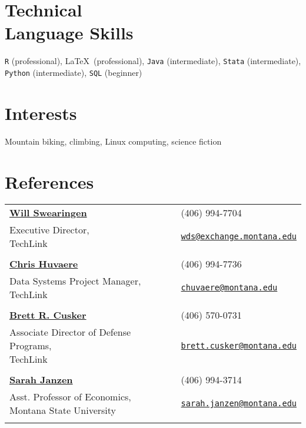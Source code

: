 \documentclass[resmargin, line, pifont ,palatino,courier]{res}
\newcommand{\halfwidth}{5.75cm}
\begin{document}
\begin{resume}
\section{\sc Technical \\ Language Skills}

\verb|R| (professional), \LaTeX~(professional), \verb|Java| (intermediate), \verb|Stata| (intermediate), \verb|Python| (intermediate), \verb|SQL| (beginner)

\section{\sc Interests} 
Mountain biking, climbing, Linux computing, science fiction

\section{\sc References}
\begin{tabular}{@{}p{\halfwidth} p{\halfwidth}}
	
{\bf \href{http://techlinkcenter.org/staff/dr-will-swearingen-clp}{Will Swearingen}} &  (406) 994-7704 \\
\parbox[t]{\halfwidth}{Executive Director, \\ TechLink} & \href{mailto:wds@exchange.montana.edu}{\texttt{wds@exchange.montana.edu}}\\
&\\
{\bf \href{http://techlinkcenter.org/staff/chris-huvaere}{Chris Huvaere}} &  (406) 994-7736 \\
\parbox[t]{\halfwidth}{Data Systems Project Manager, \\ TechLink} & \href{mailto:chuvaere@montana.edu}{\texttt{chuvaere@montana.edu}}\\
&\\
{\href{http://techlinkcenter.org/node/57762}{\bf Brett R. Cusker}} & (406) 570-0731 \\
\parbox[t]{\halfwidth}{Associate Director of Defense Programs, \\TechLink} & \href{mailto:brett.cusker@montana.edu}{\texttt{brett.cusker@montana.edu}}\\
&\\
{\href{http://www.montana.edu/sjanzen/}{\bf Sarah Janzen}} & (406) 994-3714 \\
\parbox[t]{\halfwidth}{Asst. Professor of Economics, \\Montana State University} & \href{mailto:sarah.janzen@montana.edu}{\texttt{sarah.janzen@montana.edu}}\\
&\\
\end{tabular}	




\end{resume}
\end{document}
